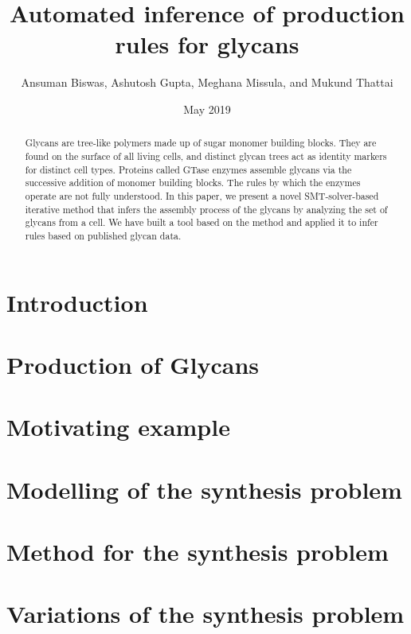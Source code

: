 \documentclass{llncs}
\title{Automated inference of production rules for glycans}
\author{Ansuman Biswas, Ashutosh Gupta, Meghana Missula, and Mukund Thattai}
\date{May 2019}
\begin{document}
\maketitle

\begin{abstract}
  Glycans are tree-like polymers made up of sugar monomer building blocks. They are found on the surface of all living cells, and distinct glycan trees act as identity markers for distinct cell types. Proteins called GTase enzymes assemble glycans via the successive addition of monomer building blocks. The rules by which the enzymes operate are not fully understood. In this paper, we present a novel SMT-solver-based iterative method that infers the assembly process of the glycans by analyzing the set of glycans from a cell. We have built a tool based on the method and applied it to infer rules based on published glycan data.
\end{abstract}


\section{Introduction}
\label{sec:intro}


\section{Production of Glycans}
\label{sec:bio}



\section{Motivating example}
\label{sec:motivation}


\section{Modelling of the synthesis problem}
\label{sec:model}



\section{Method for the synthesis problem}
\label{sec:algo}


\section{Variations of the synthesis problem}
\label{sec:variations}

\end{document}
